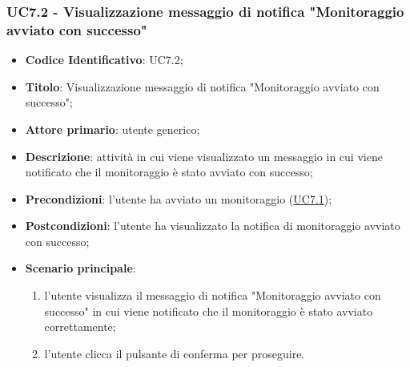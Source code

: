 	\subsubsection{UC7.2 - Visualizzazione messaggio di notifica "Monitoraggio avviato con successo"}	
		\begin{itemize}
			\item\textbf{Codice Identificativo}: UC7.2;
			\item\textbf{Titolo}: Visualizzazione messaggio di notifica "Monitoraggio avviato con successo";
			\item\textbf{Attore primario}: utente generico;
			\item\textbf{Descrizione}: attività in cui viene visualizzato un messaggio in cui viene notificato che il monitoraggio è stato avviato con successo;
			\item\textbf{Precondizioni}: l'utente ha avviato un monitoraggio (\hyperref[par:UC7.1]{UC7.1});
			\item\textbf{Postcondizioni}: l'utente ha visualizzato la notifica di monitoraggio avviato con successo;
			\item\textbf{Scenario principale}:
				\begin{enumerate}
					\item l'utente visualizza il messaggio di notifica "Monitoraggio avviato con successo" in cui viene notificato che il monitoraggio è stato avviato correttamente;
					\item l'utente clicca il pulsante di conferma per proseguire.		
				\end{enumerate}		
		\end{itemize}
		

\label{par:UC8}
